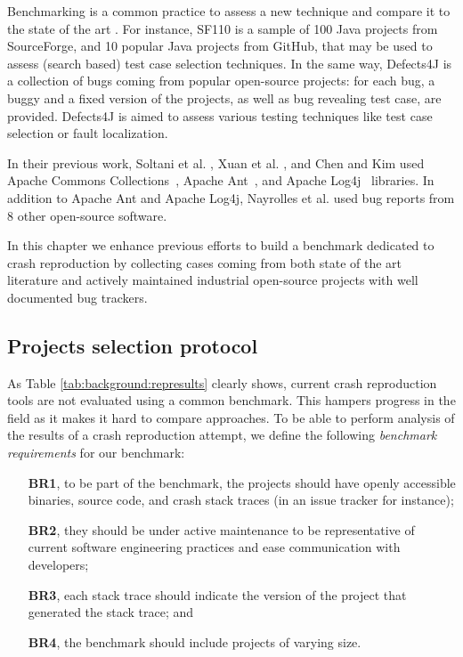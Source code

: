 
Benchmarking is a common practice to assess a new technique and compare it to the state of the art \cite{Sim2003}.
For instance, SF110 \cite{Fraser2014b} is a sample of 100 Java projects from SourceForge, and 10 popular Java projects from GitHub, that may be used to assess (search based) test case selection techniques.
In the same way, Defects4J \cite{just2014defects4j} is a collection of bugs coming from popular open-source projects: for each bug, a buggy and a fixed version of the projects, as well as bug revealing test case, are provided. Defects4J is aimed to assess various testing techniques like test case selection or fault localization.

In their previous work, Soltani et al. \cite{soltani2017}, Xuan et al. \cite{Xuan2015}, and Chen and Kim \cite{Chen2015} used Apache Commons Collections~\cite{commonscollections}, Apache Ant~\cite{ant}, and Apache Log4j~\cite{log4j} libraries.
In addition to  Apache Ant and Apache Log4j, Nayrolles et al. \cite{Nayrolles2017} used bug reports from 8 other open-source software.

In this chapter we enhance previous efforts to build a benchmark dedicated to crash reproduction by collecting cases coming from both state of the art literature and actively maintained industrial open-source projects with well documented bug trackers.

\subsection{Projects selection protocol}

As Table \ref{tab:background:represults} clearly shows, current crash reproduction tools are not evaluated using a common benchmark.
This hampers progress in the field as it makes it hard to compare approaches.
To be able to perform analysis of the results of a crash reproduction attempt, we define the following \emph{benchmark requirements} for our benchmark:
\begin{itemize}
\item[ \textbf{BR1},] to be part of the benchmark, the projects should have openly accessible binaries, source code, and crash stack traces (in an issue tracker for instance);
\item[ \textbf{BR2},] they should be under active maintenance to be representative of current software engineering practices and ease communication with developers;
\item[ \textbf{BR3},] each stack trace should indicate the version of the project that generated the stack trace; and
\item[ \textbf{BR4},] the benchmark should include projects of varying size.
\end{itemize}

